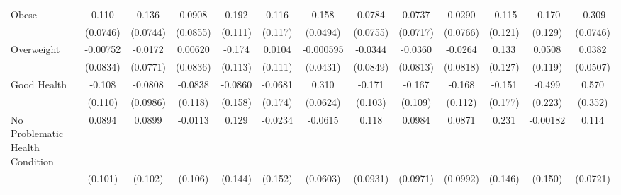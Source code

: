 {\begin{tabular}{l*{12}{c}}
\addlinespace
Obese       &       0.110         &       0.136         &      0.0908         &       0.192         &       0.116         &       0.158\sym{**} &      0.0784         &      0.0737         &      0.0290         &      -0.115         &      -0.170         &      -0.309\sym{***}\\
            &    (0.0746)         &    (0.0744)         &    (0.0855)         &     (0.111)         &     (0.117)         &    (0.0494)         &    (0.0755)         &    (0.0717)         &    (0.0766)         &     (0.121)         &     (0.129)         &    (0.0746)         \\
\addlinespace
Overweight  &    -0.00752         &     -0.0172         &     0.00620         &      -0.174         &      0.0104         &   -0.000595         &     -0.0344         &     -0.0360         &     -0.0264         &       0.133         &      0.0508         &      0.0382         \\
            &    (0.0834)         &    (0.0771)         &    (0.0836)         &     (0.113)         &     (0.111)         &    (0.0431)         &    (0.0849)         &    (0.0813)         &    (0.0818)         &     (0.127)         &     (0.119)         &    (0.0507)         \\
\addlinespace
Good Health &      -0.108         &     -0.0808         &     -0.0838         &     -0.0860         &     -0.0681         &       0.310\sym{***}&      -0.171         &      -0.167         &      -0.168         &      -0.151         &      -0.499\sym{*}  &       0.570         \\
            &     (0.110)         &    (0.0986)         &     (0.118)         &     (0.158)         &     (0.174)         &    (0.0624)         &     (0.103)         &     (0.109)         &     (0.112)         &     (0.177)         &     (0.223)         &     (0.352)         \\
\addlinespace
No Problematic Health Condition&      0.0894         &      0.0899         &     -0.0113         &       0.129         &     -0.0234         &     -0.0615         &       0.118         &      0.0984         &      0.0871         &       0.231         &    -0.00182         &       0.114         \\
            &     (0.101)         &     (0.102)         &     (0.106)         &     (0.144)         &     (0.152)         &    (0.0603)         &    (0.0931)         &    (0.0971)         &    (0.0992)         &     (0.146)         &     (0.150)         &    (0.0721)         \\

\end{tabular}}
